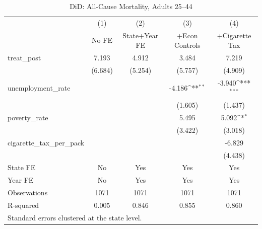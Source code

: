 \begin{table}[htbp]\centering
\def\sym#1{\ifmmode^{#1}\else\(^{#1}\)\fi}
\caption{DiD: All-Cause Mortality, Adults 25--44}
\begin{tabular}{l*{4}{c}}
\toprule
                    &\multicolumn{1}{c}{(1)}&\multicolumn{1}{c}{(2)}&\multicolumn{1}{c}{(3)}&\multicolumn{1}{c}{(4)}\\
                    &\multicolumn{1}{c}{No FE}&\multicolumn{1}{c}{State+Year FE}&\multicolumn{1}{c}{+Econ Controls}&\multicolumn{1}{c}{+Cigarette Tax}\\
\midrule
treat\_post          &       7.193         &       4.912         &       3.484         &       7.219         \\
                    &     (6.684)         &     (5.254)         &     (5.757)         &     (4.909)         \\
\addlinespace
unemployment\_rate   &                     &                     &      -4.186\sym{**} &      -3.940\sym{***}\\
                    &                     &                     &     (1.605)         &     (1.437)         \\
\addlinespace
poverty\_rate        &                     &                     &       5.495         &       5.092\sym{*}  \\
                    &                     &                     &     (3.422)         &     (3.018)         \\
\addlinespace
cigarette\_tax\_per\_pack&                     &                     &                     &      -6.829         \\
                    &                     &                     &                     &     (4.438)         \\
\midrule
State FE            &          No         &         Yes         &         Yes         &         Yes         \\
Year FE             &          No         &         Yes         &         Yes         &         Yes         \\
Observations        &        1071         &        1071         &        1071         &        1071         \\
R-squared           &       0.005         &       0.846         &       0.855         &       0.860         \\
\bottomrule
\multicolumn{5}{l}{\footnotesize Standard errors clustered at the state level.}\\
\end{tabular}
\end{table}
